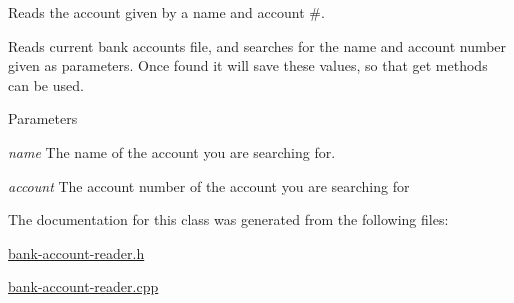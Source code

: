 Reads the account given by a name and account \#. 

Reads current bank accounts file, and searches for the name and account number given as parameters. Once found it will save these values, so that get methods can be used.


\begin{DoxyParams}{Parameters}
\item[{\em name}]The name of the account you are searching for.\item[{\em account}]The account number of the account you are searching for \end{DoxyParams}


The documentation for this class was generated from the following files:\begin{DoxyCompactItemize}
\item 
\hyperlink{bank-account-reader_8h}{bank-\/account-\/reader.h}\item 
\hyperlink{bank-account-reader_8cpp}{bank-\/account-\/reader.cpp}\end{DoxyCompactItemize}
